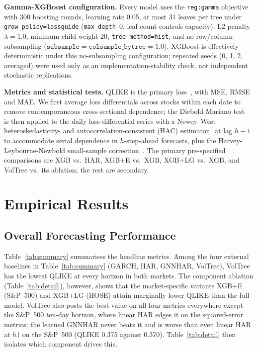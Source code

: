 \documentclass[runningheads,a4paper]{llncs}
\begin{document}
\textbf{Gamma-XGBoost configuration.} Every model uses the \texttt{reg:gamma} objective with 300 boosting
rounds, learning rate 0.05, at most 31 leaves per tree under \texttt{grow\_policy=lossguide}
(\texttt{max\_depth}~0, leaf count controls capacity), L2 penalty $\lambda=1.0$, minimum child weight 20,
\texttt{tree\_method=hist}, and no row/column subsampling
($\texttt{subsample}=\texttt{colsample\_bytree}=1.0$). XGBoost is effectively deterministic under this
no-subsampling configuration; repeated seeds (0, 1, 2, averaged) were used only as an implementation-stability
check, not independent stochastic replications.

\textbf{Metrics and statistical tests.} QLIKE is the primary loss~\cite{patton2011}, with MSE, RMSE and
MAE. We first average loss differentials across stocks within each date to remove contemporaneous
cross-sectional dependence; the Diebold-Mariano test~\cite{dm1995} is then applied to the daily
loss-differential series with a Newey--West heteroskedasticity- and autocorrelation-consistent (HAC) estimator~\cite{neweywest1987} at lag $h-1$ to accommodate
serial dependence in $h$-step-ahead forecasts, plus the Harvey-Leybourne-Newbold small-sample
correction~\cite{hln1997}. The primary pre-specified comparisons are XGB vs.\ HAR, XGB+E vs.\ XGB, XGB+LG
vs.\ XGB, and VolTree vs.\ its ablation; the rest are secondary.


\section{Empirical Results}

\subsection{Overall Forecasting Performance}
Table~\ref{tab:summary} summarises the headline metrics. Among the four external baselines in
Table~\ref{tab:summary} (GARCH, HAR, GNNHAR, VolTree), VolTree has the lowest QLIKE at every horizon in
both markets. The component ablation (Table~\ref{tab:detail}), however, shows that the market-specific
variants XGB+E (S\&P~500) and XGB+LG (HOSE) attain marginally lower QLIKE than the full model. VolTree also posts the best value on all four metrics
everywhere except the S\&P~500 ten-day horizon, where linear HAR edges it on the squared-error metrics; the
learned GNNHAR never beats it and is worse than even linear HAR at $h1$ on the S\&P~500 (QLIKE 0.375 against
0.370). Table~\ref{tab:detail} then isolates which component drives this.
\end{document}
